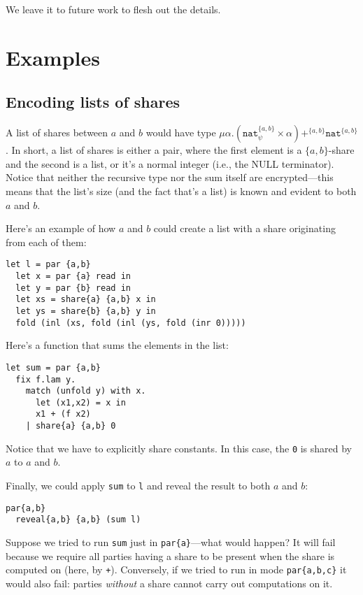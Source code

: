\documentclass[10pt]{article}
\newcommand{\tnat}{\ensuremath{\mathtt{nat}}}
\newcommand{\tprod}[2]{\ensuremath{{#1} \times {#2}}}
\newcommand{\tsum}[3]{\ensuremath{{#1} +^{#3} {#2}}}
\newcommand{\trec}[2]{\ensuremath{\mu {#1}.{#2}}}
\begin{document}
We leave it to future work to flesh out the details. 

\section{Examples}
\label{sec:examples}

\subsection{Encoding lists of shares}

\newcommand{\twoprins}{\ensuremath{\{a,b\}}}

A list of shares between $a$ and $b$ would have type
$\trec{\alpha}{\tsum{(\tprod{\tnat^{\twoprins}_\psi}{\alpha})}{\tnat^{\twoprins}}{\twoprins}}$. In
short, a list of shares is either a pair, where the first element is a
\twoprins-share and the second is a list, or it's a normal integer
(i.e., the NULL terminator). Notice that neither the recursive type
nor the sum itself are encrypted---this means that the list's size
(and the fact that's a list) is known and evident to both $a$ and $b$.

Here's an example of how $a$ and $b$ could create a list with a share
originating from each of them:
\begin{verbatim}
let l = par {a,b}
  let x = par {a} read in
  let y = par {b} read in
  let xs = share{a} {a,b} x in
  let ys = share{b} {a,b} y in
  fold (inl (xs, fold (inl (ys, fold (inr 0)))))
\end{verbatim}
Here's a function that sums the elements in the list:
\begin{verbatim}
let sum = par {a,b}
  fix f.lam y.
    match (unfold y) with x.
      let (x1,x2) = x in
      x1 + (f x2)
    | share{a} {a,b} 0
\end{verbatim}
Notice that we have to explicitly share constants. In this case, the
\verb+0+ is shared by $a$ to $a$ and $b$.

Finally, we could apply \verb+sum+ to \verb+l+ and reveal the result
to both $a$ and $b$:
\begin{verbatim}
par{a,b}
  reveal{a,b} {a,b} (sum l)
\end{verbatim}

Suppose we tried to run \verb+sum+ just in \verb+par{a}+---what would
happen? It will fail because we require all parties having a share to
be present when the share is computed on (here, by
\verb!+!). Conversely, if we tried to run in mode \verb+par{a,b,c}+ it
would also fail: parties \emph{without} a share cannot carry out
computations on it.
\end{document}
